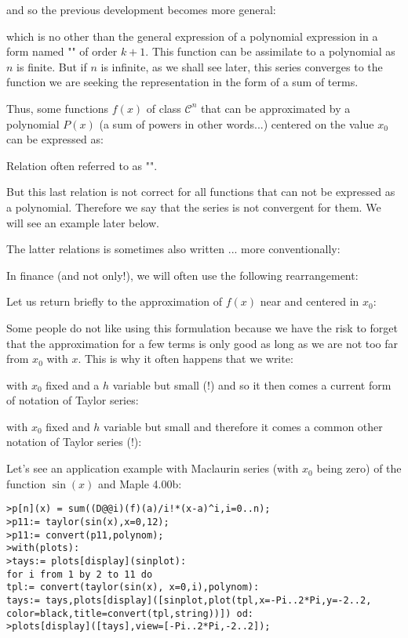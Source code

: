 	and so the previous development becomes more general:
	
	which is no other than the general expression of a polynomial expression in a form named "" of order $k + 1$. This function can be assimilate to a polynomial as $n$ is finite. But if $n$ is infinite, as we shall see later, this series converges to the function we are seeking the representation in the form of a sum of terms.
	
	Thus, some functions $f (x)$ of class $\mathcal{C}^n$ that can be approximated by a polynomial $P (x)$ (a sum of powers in other words...) centered on the value $x_0$ can be expressed as:
	
	Relation often referred to as "".
	
	But this last relation is not correct for all functions that can not be expressed as a polynomial. Therefore we say that the series is not convergent for them. We will see an example later below.
	
	The latter relations is sometimes also written ... more conventionally:
	
	In finance (and not only!), we will often use the following rearrangement:
	
	Let us return briefly to the approximation of $f (x)$ near and centered in $x_0$:
	
	Some people do not like using this formulation because we have the risk to forget that the approximation for a few terms is only good as long as we are not too far from $x_0$ with $x$. This is why it often happens that we write:
	
	with $x_0$ fixed and a $h$ variable but small (!) and so it then comes a current form of notation of Taylor series:
	
	with $x_0$ fixed and $h$ variable but small and therefore it comes a common other notation of Taylor series (!):
	
	Let's see an application example with Maclaurin series (with $x_0$ being zero) of the function $\sin (x)$ and Maple 4.00b:
	
	\texttt{>p[n](x) = sum((D@@i)(f)(a)/i!*(x-a)\string^i,i=0..n);\\
	>p11:= taylor(sin(x),x=0,12);\\
	>p11:= convert(p11,polynom);\\
	>with(plots):\\
	>tays:= plots[display](sinplot):\\
	for i from 1 by 2 to 11 do\\
	tpl:= convert(taylor(sin(x), x=0,i),polynom):\\
	tays:= tays,plots[display]([sinplot,plot(tpl,x=-Pi..2*Pi,y=-2..2,\\
	color=black,title=convert(tpl,string))]) od: \\
	>plots[display]([tays],view=[-Pi..2*Pi,-2..2]);}

